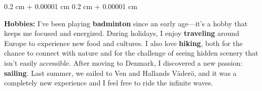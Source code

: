 \documentclass[10pt, letterpaper]{article}
\newenvironment{onecolentry}{
    \begin{adjustwidth}{
        0.2 cm + 0.00001 cm
    }{
        0.2 cm + 0.00001 cm
    }
}{
    \end{adjustwidth}
} %
\begin{document}


        \vspace{0.2 cm}

        \begin{onecolentry}
            \textbf{Hobbies:} 
            I’ve been playing \textbf{badminton} since an early age—it’s a hobby that keeps me focused and energized. During holidays, I enjoy \textbf{traveling} around Europe to experience new food and cultures. I also love \textbf{hiking}, both for the chance to connect with nature and for the challenge of seeing hidden scenery that isn’t easily accessible. After moving to Denmark, I discovered a new passion: \textbf{sailing}. Last summer, we sailed to Ven and Hallands Väderö, and it was a completely new experience and  I feel free to ride the infinite waves.
        \end{onecolentry}


    
\end{document}
